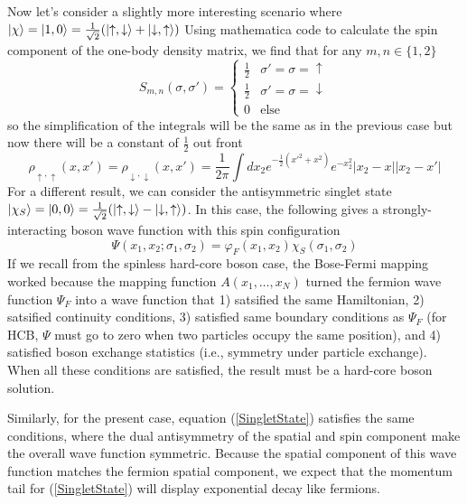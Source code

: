 \documentclass[onecolumn,english,aps,pra]{revtex4}
\begin{document}
Now let's consider a slightly more interesting scenario where
$\ket{\chi} = \ket{1, 0} = 
\frac{1}{\sqrt{2}}(\ket{\uparrow, \downarrow} + \ket{\downarrow, \uparrow})$
Using mathematica code to calculate the spin component of the one-body density matrix, we find that for any $m, n \in \{ 1,2 \}$
%
\begin{equation}
S_{m, n}(\sigma, \sigma') = 
\begin{cases}
	\frac{1}{2} & \sigma' = \sigma = \uparrow\\
	\frac{1}{2} & \sigma' = \sigma = \downarrow \\
	0 & \text{else}
\end{cases}
\end{equation}
%
so the simplification of the integrals will be the same as in the previous case but now there will be a constant of $\frac{1}{2}$ out front 
\begin{equation}
\rho_{\uparrow, \uparrow}(x, x')
= \rho_{\downarrow,\downarrow}(x, x')
 = \frac{1}{2\pi} \int dx_2 e^{-\frac{1}{2} (x'^2 + x^2) } e^{-x_2^2} |x_2 - x||x_2 - x'|
\end{equation}
For a different result, we can consider the antisymmetric singlet state $\ket{\chi_S} = \ket{0,0} = 
\frac{1}{\sqrt{2}}(\ket{\uparrow, \downarrow} - \ket{\downarrow, \uparrow}) $. In this case, the following gives a strongly-interacting boson wave function with this spin configuration
\begin{equation}
\Psi(x_1, x_2;\sigma_1, \sigma_2) = \varphi_F(x_1, x_2) \chi_S(\sigma_1, \sigma_2)
\label{SingletState}
\end{equation}
If we recall from the spinless hard-core boson case, the Bose-Fermi mapping \cite{girardeau1960relationship} worked because the mapping function $A(x_1, \ldots, x_N)$ turned the fermion wave function $\Psi_F$ into a wave function that 1) satsified the same Hamiltonian, 2) satsified continuity conditions, 3) satisfied same boundary conditions as $\Psi_F$ (for HCB, $\Psi$ must go to zero when two particles occupy the same position), and 4) satisfied boson exchange statistics (i.e., symmetry under particle exchange). When all these conditions are satisfied, the result must be a hard-core boson solution.

Similarly, for the present case, equation (\ref{SingletState}) satisfies the same conditions, where the dual antisymmetry of the spatial and spin component make the overall wave function symmetric. Because the spatial component of this wave function matches the fermion spatial component, we expect that the momentum tail for (\ref{SingletState}) will display exponential decay like fermions.
\end{document}

